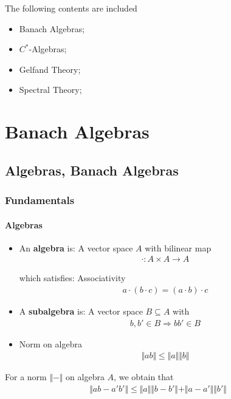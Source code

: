 \documentclass[Total.tex]{subfiles}
\begin{document}
	The following contents are included
	\begin{itemize}
		\item Banach Algebras;
		\item $C^*$-Algebras;
		\item Gelfand Theory;
		\item Spectral Theory;
	\end{itemize}
	
	\chapter{Banach Algebras}
		\section{Algebras, Banach Algebras}
		\subsection{Fundamentals}
		\subsubsection{Algebras}
		\begin{Def}
			\begin{itemize}
				\item An \textbf{algebra} is: A vector space $A$ with bilinear map
				\begin{gather*}
					\cdot:A\times A\rightarrow A
				\end{gather*}
				
				which satisfies: Associativity
				\begin{gather*}
					a\cdot (b\cdot c)=(a\cdot b)\cdot c
				\end{gather*}
				\item A \textbf{subalgebra} is: A vector space $B\subseteq A$ with
				\begin{gather*}
					b,b'\in B\Rightarrow bb'\in B
				\end{gather*}
				
				\item Norm on algebra
				\begin{gather*}
					\Vert ab\Vert\leq \Vert a\Vert\Vert b\Vert
				\end{gather*}
			\end{itemize}
		\end{Def}
		
		\begin{proposition}
			For a norm $\Vert-\Vert$ on algebra $A$, we obtain that
			\begin{gather*}
				\Vert ab-a'b'\Vert\leq \Vert a\Vert\Vert b-b'\Vert+\Vert a-a'\Vert\Vert b'\Vert
			\end{gather*}
		\end{proposition}
\end{document}
